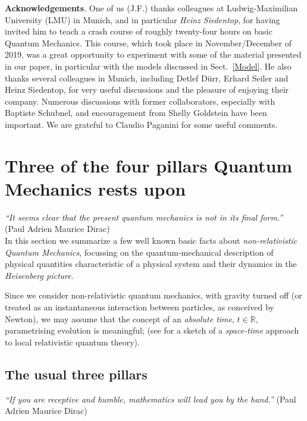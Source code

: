 \documentclass[12pt]{article}
\begin{document}
{\bf{Acknowledgements}}. One of us (J.F.) thanks colleagues at Ludwig-Maximilian University (LMU) in Munich, and 
in particular \textit{Heinz Siedentop}, for having invited him to teach a crash course of roughly twenty-four hours on 
basic Quantum  Mechanics. This course, which took place in November/December of 2019, was a great opportunity 
to experiment with some of the material presented in our paper, in particular with the models discussed in Sect.~\ref{Model}. 
He also thanks several colleagues in Munich, including {Detlef D\"urr, Erhard Seiler} and {Heinz Siedentop}, 
for very useful discussions and the pleasure of enjoying their company. Numerous discussions with former collaborators, especially with {Baptiste Schubnel}, and encouragement from {Shelly Goldstein} have been important. We are grateful to {Claudio Paganini} for some useful comments.


\section{Three of the four pillars Quantum Mechanics rests upon}\label{three pillars}

\hspace{0.5cm} \textit{``It seems clear that the present quantum mechanics is not in its final form.''} (Paul Adrien Maurice Dirac)\\

In this section we summarize a few well known basic facts about \textit{non-relativistic Quantum Mechanics}, focussing on the quantum-mechanical description of physical quantities characteristic of a physical system and their 
dynamics in the \textit{Heisenberg picture}. 

Since we consider non-relativistic quantum mechanics, with gravity turned off (or treated as an instantaneous interaction 
between particles, as conceived by Newton), we may assume that the concept of an \textit{absolute time}, 
$t\in \mathbb{R}$, parametrising evolution is meaningful; (see \cite{Fr2} for a sketch of a \textit{space-time} 
approach to local relativistic quantum theory). 

\subsection{The usual three pillars}
\hspace{0.5cm}\textit{``If you are receptive and humble, mathematics will lead you by the hand.''} (Paul Adrien Maurice Dirac)
\end{document}
